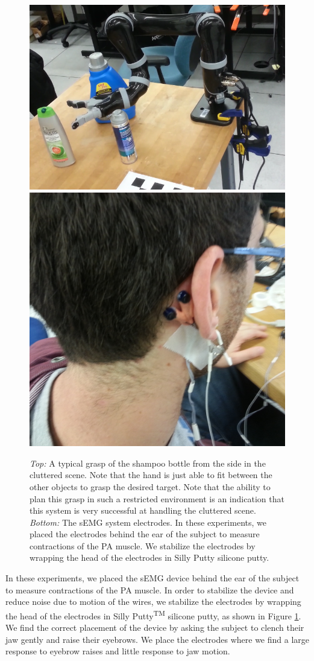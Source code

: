 \begin{figure}
\centering
\includegraphics[width=.49\textwidth]{images_4/semg_clutter_grasp.png}
\hspace{1mm}
\includegraphics[width=.49\textwidth,trim={30cm 40cm 20cm 20cm},clip=true]{user_semg_2.jpg}
\caption{\emph{Top:} A typical grasp of the shampoo bottle from the side in the cluttered scene. Note that the hand is just able to fit between the other objects to grasp the desired target. Note that the ability to plan this grasp in such a restricted environment is an indication that this system is very successful at handling the cluttered scene. \emph{Bottom:} The sEMG system electrodes. In these experiments, we placed the electrodes behind the ear of the subject to measure contractions of the PA muscle. We stabilize the electrodes by wrapping the head of the electrodes in Silly Putty silicone putty.}

\label{fig:silly-putty}
\end{figure}

In these experiments, we placed the sEMG device behind the ear of the subject to measure contractions of the PA muscle. In order to stabilize the device and reduce noise due to motion of the wires, we stabilize the electrodes by wrapping the head of the electrodes in Silly Putty\textsuperscript{TM} silicone putty, as shown in Figure \ref{fig:silly-putty}. We find the correct placement of the device by asking the subject to clench their jaw gently and raise their eyebrows. We place the electrodes where we find a large response to eyebrow raises and  little response to jaw motion.

